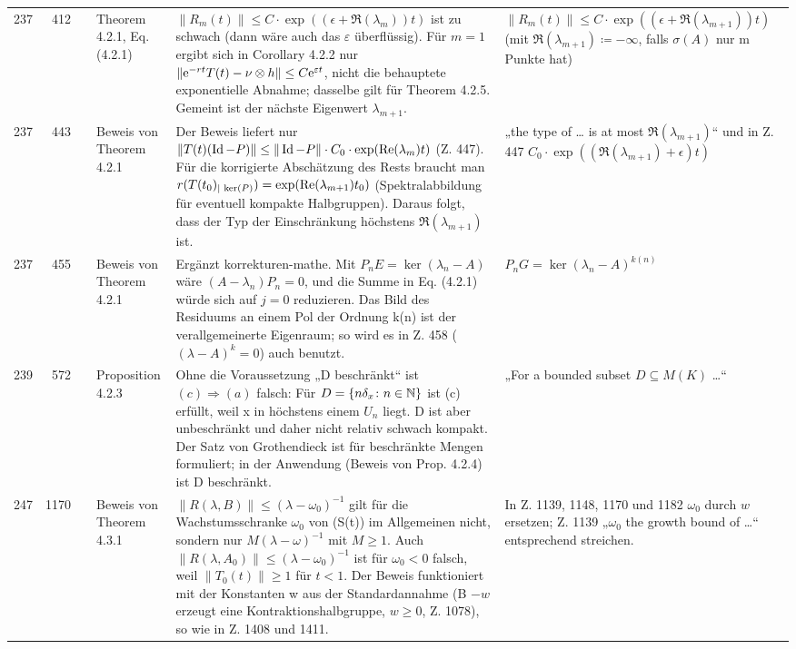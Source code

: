 \documentclass[10pt]{article}
\begin{document}
\begin{longtable}{@{}rrc>{\RaggedRight\arraybackslash}p{3.0cm}>{\RaggedRight\arraybackslash}p{11.4cm}>{\RaggedRight\arraybackslash}p{7.4cm}@{}}
237 & 412 & \sichA{} & Theorem 4.2.1, Eq. (4.2.1) & $\|R_m(t)\| \leq C \cdot \exp((\epsilon +\Re(\lambda_m))t)$ ist zu schwach (dann wäre auch das $\ensuremath{\varepsilon}$ überflüssig). Für $m = 1$ ergibt sich in Corollary 4.2.2 nur $\|\eu^{-rt}T(t) - \nu\otimes h\| \leq C\eu^{\epsilon t}$, nicht die behauptete exponentielle Abnahme; dasselbe gilt für Theorem 4.2.5. Gemeint ist der nächste Eigenwert $\ensuremath{\lambda}_{m+1}$. & $\|R_m(t)\| \leq C \cdot \exp((\epsilon +\Re(\lambda_{m+1}))t)$ (mit $\Re(\lambda_{m+1}) \coloneq -\infty$, falls $\ensuremath{\sigma}(A)$ nur m Punkte hat) \\[2pt]
237 & 443 & \sichB{} & Beweis von Theorem 4.2.1 & Der Beweis liefert nur $\|T(t)(\Id -P)\| \leq \|\Id -P\|\cdot C_{0} \cdot \exp(\Re(\lambda_m) t)$ (Z. 447). Für die korrigierte Abschätzung des Rests braucht man $r(T(t_0)_{\vert \mathop{}\mathrm{ker}(P)}) = \exp(\mathop{}\!\mathrm{Re}(\lambda_{m+1}) t_0)$ (Spektralabbildung für eventuell kompakte Halbgruppen). Daraus folgt, dass der Typ der Einschränkung höchstens $\Re (\ensuremath{\lambda}_{m+1})$ ist. & „the type of \dots{} is at most $\Re(\lambda_{m+1})$“ und in Z. 447 $C_{0} \cdot \exp((\Re(\lambda_{m+1})+\epsilon) t)$ \\[2pt]
237 & 455 & \sichA{} & Beweis von Theorem 4.2.1 & Ergänzt korrekturen-mathe. Mit $P_n E = \ker(\lambda_n-A)$ wäre $(A-\lambda_n)P_n = 0$, und die Summe in Eq. (4.2.1) würde sich auf $j = 0$ reduzieren. Das Bild des Residuums an einem Pol der Ordnung k(n) ist der verallgemeinerte Eigenraum; so wird es in Z. 458 ($(\lambda - A)^k = 0$) auch benutzt. & $P_n G = \ker(\lambda_n-A)^{k(n)}$ \\[2pt]
239 & 572 & \sichA{} & Proposition 4.2.3 & Ohne die Voraussetzung „D beschränkt“ ist $(c) \ensuremath{\Rightarrow} (a)$ falsch: Für $D = \{n\delta_x \colon n \in \mathbb{N}\}$ ist (c) erfüllt, weil x in höchstens einem $U_n$ liegt. D ist aber unbeschränkt und daher nicht relativ schwach kompakt. Der Satz von Grothendieck ist für beschränkte Mengen formuliert; in der Anwendung (Beweis von Prop. 4.2.4) ist D beschränkt. & „For a bounded subset $D \subseteq M(K)$ \dots{}“ \\[2pt]
247 & 1170 & \sichA{} & Beweis von Theorem 4.3.1 & $\|R(\lambda,B)\| \leq (\lambda-\omega_0)^{-1}$ gilt für die Wachstumsschranke $\ensuremath{\omega}_0$ von (S(t)) im Allgemeinen nicht, sondern nur $M(\lambda-\omega)^{-1}$ mit $M \ensuremath{\geq} 1$. Auch $\|R(\lambda,A_0)\| \leq (\lambda-\omega_0)^{-1}$ ist für $\ensuremath{\omega}_0 < 0$ falsch, weil $\ensuremath{\|}T_0(t)\ensuremath{\|} \ensuremath{\geq} 1$ für $t < 1$. Der Beweis funktioniert mit der Konstanten w aus der Standardannahme (B $\ensuremath{-} w$ erzeugt eine Kontraktionshalbgruppe, $w \ensuremath{\geq} 0$, Z. 1078), so wie in Z. 1408 und 1411. & In Z. 1139, 1148, 1170 und 1182 $\omega_0$ durch $w$ ersetzen; Z. 1139 „$\omega_0$ the growth bound of \dots{}“ entsprechend streichen. \\[2pt]

\end{longtable}
\end{document}
